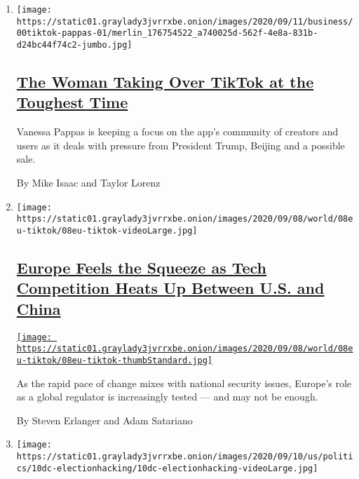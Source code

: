 \begin{enumerate}
\def\labelenumi{\arabic{enumi}.}
\item
  \texttt{[image: https://static01.graylady3jvrrxbe.onion/images/2020/09/11/business/00tiktok-pappas-01/merlin\_176754522\_a740025d-562f-4e8a-831b-d24bc44f74c2-jumbo.jpg]}

  \hypertarget{the-woman-taking-over-tiktok-at-the-toughest-time}{%
  \subsection{\texorpdfstring{\href{/2020/09/11/technology/tiktok-vanessa-pappas-bytedance.html}{The
  Woman Taking Over TikTok at the Toughest
  Time}}{The Woman Taking Over TikTok at the Toughest Time}}\label{the-woman-taking-over-tiktok-at-the-toughest-time}}

  Vanessa Pappas is keeping a focus on the app's community of creators
  and users as it deals with pressure from President Trump, Beijing and
  a possible sale.

  By Mike Isaac and Taylor Lorenz
\item
  \texttt{[image: https://static01.graylady3jvrrxbe.onion/images/2020/09/08/world/08eu-tiktok/08eu-tiktok-videoLarge.jpg]}

  \hypertarget{europe-feels-the-squeeze-as-tech-competition-heats-up-between-us-and-china}{%
  \subsection{\texorpdfstring{\href{/2020/09/11/world/europe/eu-us-china-technology.html}{Europe
  Feels the Squeeze as Tech Competition Heats Up Between U.S. and
  China}}{Europe Feels the Squeeze as Tech Competition Heats Up Between U.S. and China}}\label{europe-feels-the-squeeze-as-tech-competition-heats-up-between-us-and-china}}

  \href{/2020/09/11/world/europe/eu-us-china-technology.html}{\texttt{[image: https://static01.graylady3jvrrxbe.onion/images/2020/09/08/world/08eu-tiktok/08eu-tiktok-thumbStandard.jpg]}}

  As the rapid pace of change mixes with national security issues,
  Europe's role as a global regulator is increasingly tested --- and may
  not be enough.

  By Steven Erlanger and Adam Satariano
\item
  \texttt{[image: https://static01.graylady3jvrrxbe.onion/images/2020/09/10/us/politics/10dc-electionhacking/10dc-electionhacking-videoLarge.jpg]}


\end{enumerate}
